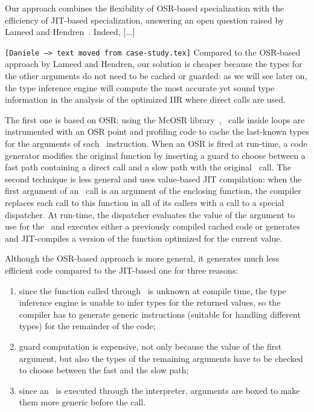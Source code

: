 \noindent Our approach combines the flexibility of OSR-based specialization with the efficiency of JIT-based specialization, answering an open question raised by Lameed and Hendren~\cite{lameed2013feval}. Indeed, [...]

{\tt [Daniele --> text moved from case-study.tex]} Compared to the OSR-based approach by Lameed and Hendren, our solution is cheaper because the types for the other arguments do not need to be cached or guarded: as we will see later on, the type inference engine will compute the most accurate yet sound type information in the analysis of the optimized IIR where direct calls are used.

\ifdefined\fullver
The first one is based on OSR: using the McOSR library~\cite{lameed2013modular}, \feval\ calls inside loops are instrumented with an OSR point and profiling code to cache the last-known types for the arguments of each \feval\ instruction. When an OSR is fired at run-time, a code generator modifies the original function by inserting a guard to choose between a fast path containing a direct call and a slow path with the original \feval\ call. The second technique is less general and uses value-based JIT compilation: when the first argument of an \feval\ call is an argument of the enclosing function, the compiler replaces each call to this function in all of its callers with a call to a special dispatcher. At run-time, the dispatcher evaluates the value of the argument to use for the \feval\ and executes either a previously compiled cached code or generates and JIT-compiles a version of the function optimized for the current value.

Although the OSR-based approach is more general, it generates much less efficient code compared to the JIT-based one for three reasons:
\begin{enumerate}
\item since the function called through \feval\ is unknown at compile time, the type inference engine is unable to infer types for the returned values, so the compiler has to generate generic instructions (suitable for handling different types) for the remainder of the code;
\item guard computation is expensive, not only because the value of the first argument, but also the types of the remaining arguments have to be checked to choose between the fast and the slow path;
\item since an \feval\ is executed through the interpreter, arguments are boxed to make them more generic before the call.
\end{enumerate}

